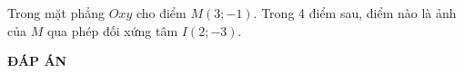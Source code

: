 \begin{ex}%
Trong mặt phẳng $Oxy$ cho điểm $M(3;-1)$. Trong 4 điểm sau, điểm nào là ảnh của $M$ qua phép đối xứng tâm $I(2;-3)$.
\end{ex}

\newpage
\begin{center}
	\textbf{ĐÁP ÁN}
\end{center}
\begin{multicols}{10}
	 
\end{multicols}


